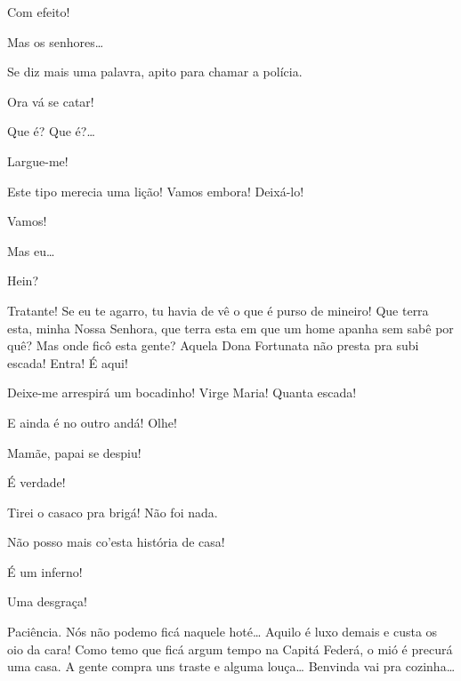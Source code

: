  Com efeito!

 Mas os senhores\ldots{}

  Se diz mais uma palavra, apito
para chamar a polícia.

 Ora vá se catar! 

 Que é? Que é?\ldots{} 

 Largue-me!

 Este tipo merecia uma lição!  Vamos embora!
Deixá-lo!

 Vamos!

  Mas eu\ldots{}

 Hein? 


 Tratante! Se eu te agarro, tu havia de vê o que é purso de
mineiro! Que terra esta, minha Nossa Senhora, que terra esta em que um home apanha sem
sabê por quê? Mas onde ficô esta gente? Aquela Dona Fortunata não presta pra
subi escada!  Entra! É aqui! 

  Deixe-me arrespirá um
bocadinho! Virge Maria! Quanta escada!

 E ainda é no outro andá! Olhe! 

  Mamãe, papai se despiu!

 É verdade!

 Tirei o casaco pra brigá! Não foi nada.

 Não posso mais co’esta história de casa!

 É um inferno!

 Uma desgraça!

 Paciência. Nós não podemo ficá naquele hoté\ldots{} Aquilo é luxo
demais e custa os oio da cara! Como temo que ficá argum tempo na Capitá Federá, o
mió é precurá uma casa. A gente compra uns traste e alguma louça\ldots{} Benvinda vai
pra cozinha\ldots{}

